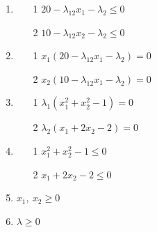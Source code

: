\documentclass[12pt,a4paper]{article}
\begin{document}
\begin{enumerate}
\item \begin{enumerate}
\item[1] $20 -\lambda_12x_1 - \lambda_2 \leq 0$
\item[2] $10 - \lambda_12x_2 - \lambda_2 \leq 0$\end{enumerate}
\item \begin{enumerate}
\item[1] $x_1(20 -\lambda_12x_1 - \lambda_2) = 0$
\item[2] $x_2(10 -\lambda_12x_1 - \lambda_2)=0$
\end{enumerate}
\item \begin{enumerate}
\item[1] $\lambda_1(x_1^2 + x_2^2 - 1) = 0$
\item[2] $\lambda_2(x_1+2x_2-2) =0$
\end{enumerate}
\item \begin{enumerate}
\item[1] $x_1^2 + x_2^2 - 1\leq 0$
\item[2] $x_1+2x_2-2 \leq 0$
\end{enumerate}
\item $x_1,\ x_2 \geq 0$
\item $\lambda \geq 0$
\end{enumerate}
\end{document}
